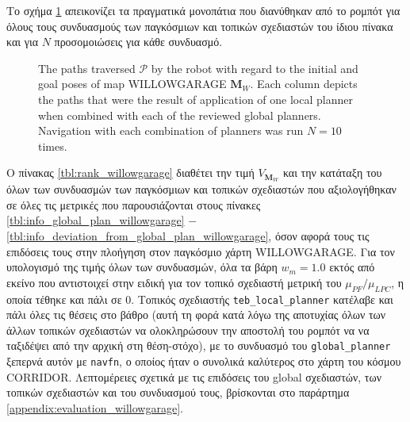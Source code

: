 Το σχήμα \ref{fig:ground_truths:willowgarage} απεικονίζει τα πραγματικά μονοπάτια που διανύθηκαν
από το ρομπότ για όλους τους συνδυασμούς των παγκόσμιων και τοπικών σχεδιαστών του
ίδιου πίνακα και για $N$ προσομοιώσεις για κάθε συνδυασμό.

\begin{figure}
\raggedright
  \begin{subfigure}[t]{\linewidth}
    \centering
    
  \end{subfigure}%
  \vspace{-1.5cm}
  \begin{subfigure}[t]{\linewidth}
    \centering
    
  \end{subfigure}%
  \vspace{-1.5cm}
  \begin{subfigure}[t]{\linewidth}
    \centering
    
  \end{subfigure}%
  \caption{The paths traversed $\bm{\mathcal{P}}$ by the robot with regard to
           the initial and goal poses of map WILLOWGARAGE $\bm{M}_W$. Each
           column depicts the paths that were the result of application of one
           local planner when combined with each of the reviewed global
           planners. Navigation with each combination of planners was run
           $N=10$ times.}
  \label{fig:ground_truths:willowgarage}
\end{figure}


Ο πίνακας \ref{tbl:rank_willowgarage} διαθέτει την τιμή $V_{\bm{M}_W}$ και την κατάταξη του
όλων των συνδυασμών των παγκόσμιων και τοπικών σχεδιαστών που αξιολογήθηκαν σε όλες τις μετρικές
που παρουσιάζονται στους πίνακες \ref{tbl:info_global_plan_willowgarage} $-$
\ref{tbl:info_deviation_from_global_plan_willowgarage}, όσον αφορά τους
τις επιδόσεις τους στην πλοήγηση στον παγκόσμιο χάρτη WILLOWGARAGE.
Για τον υπολογισμό της τιμής όλων των συνδυασμών, όλα τα βάρη $w_m = 1.0$
εκτός από εκείνο που αντιστοιχεί στην ειδική για τον τοπικό σχεδιαστή μετρική του
$\mu_{PF} / \mu_{LPC}$, η οποία τέθηκε και πάλι σε $0$. Τοπικός σχεδιαστής
\texttt{teb\_local\_planner} κατέλαβε και πάλι όλες τις θέσεις στο βάθρο (αυτή τη φορά κατά
λόγω της αποτυχίας όλων των άλλων τοπικών σχεδιαστών να ολοκληρώσουν την αποστολή του ρομπότ να
να ταξιδέψει από την αρχική στη θέση-στόχο), με το συνδυασμό του
\texttt{global\_planner} ξεπερνά αυτόν με \texttt{navfn}, ο οποίος ήταν ο
συνολικά καλύτερος στο χάρτη του κόσμου CORRIDOR. Λεπτομέρειες σχετικά με τις επιδόσεις του global
σχεδιαστών, των τοπικών σχεδιαστών και του συνδυασμού τους, βρίσκονται στο παράρτημα
\ref{appendix:evaluation_willowgarage}.

